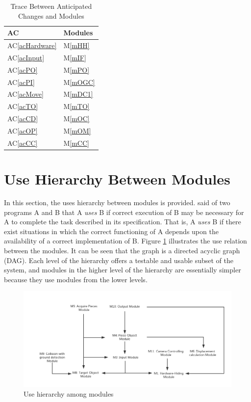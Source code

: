 \documentclass[12pt, titlepage]{article}
\newcommand{\acref}[1]{AC\ref{#1}}
\newcommand{\mref}[1]{M\ref{#1}}
\begin{document}
	\begin{table}[H]
		\centering
		\begin{tabular}{p{} p{}}
			\toprule
			\textbf{AC} & \textbf{Modules}\\
			\midrule
			\acref{acHardware} & \mref{mHH}\\
			\acref{acInput} & \mref{mIF}\\
			\acref{acPO} & \mref{mPO}\\
			\acref{acPI} & \mref{mOGC}\\
			\acref{acMove} & \mref{mDC1}\\
			\acref{acTO} & \mref{mTO}\\
			\acref{acCD} & \mref{mOC}\\
			\acref{acOP} & \mref{mOM}\\
			\acref{acCC} & \mref{mCC}\\
			\bottomrule
		\end{tabular}
		\caption{Trace Between Anticipated Changes and Modules}
		\label{TblACT}
	\end{table}
	
	\section{Use Hierarchy Between Modules} \label{SecUse}
	
	In this section, the uses hierarchy between modules is
	provided. \citet{Parnas1978} said of two programs A and B that A {\em uses} B if
	correct execution of B may be necessary for A to complete the task described in
	its specification. That is, A {\em uses} B if there exist situations in which
	the correct functioning of A depends upon the availability of a correct
	implementation of B.  Figure \ref{FigUH} illustrates the use relation between
	the modules. It can be seen that the graph is a directed acyclic graph
	(DAG). Each level of the hierarchy offers a testable and usable subset of the
	system, and modules in the higher level of the hierarchy are essentially simpler
	because they use modules from the lower levels.
	
	\begin{figure}[H]
		\centering
		\includegraphics[width=1.1\textwidth]{./Figure1.png}
		\caption{Use hierarchy among modules}
		\label{FigUH}
	\end{figure}
	
\end{document}
